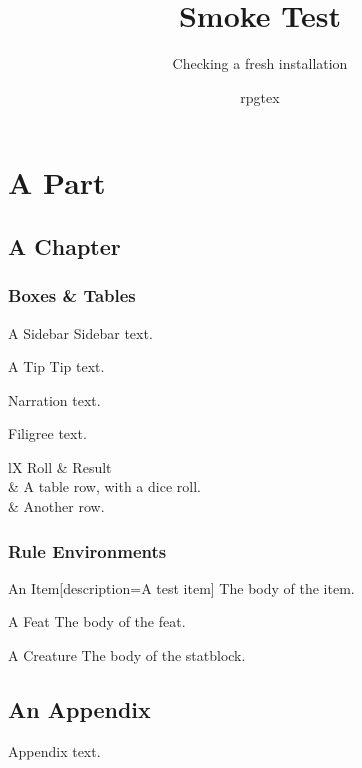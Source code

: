 \documentclass{rpgbook}
\title{Smoke Test}
\subtitle{Checking a fresh installation}
\author{rpgtex}
\begin{document}
\maketitle
\tableofcontents

\part{A Part}
\chapter{A Chapter}

\section{Boxes \& Tables}

\begin{RpgSidebar}{A Sidebar}
	Sidebar text.
\end{RpgSidebar}

\begin{RpgTip}{A Tip}
	Tip text.
\end{RpgTip}

\begin{RpgNarration}
	Narration text.
\end{RpgNarration}

\begin{RpgFiligree}
	Filigree text.
\end{RpgFiligree}

\begin{RpgTable}[title={A Table}]{lX}
	Roll & Result
	\\
	 & A table row, with a dice roll.
	\\
	 & Another row.
\end{RpgTable}

\section{Rule Environments}

\begin{RpgItem}{An Item}[description={A test item}]
	The body of the item.
\end{RpgItem}

\begin{RpgFeat}{A Feat}
	The body of the feat.
\end{RpgFeat}

\begin{RpgStat}{A Creature}
	The body of the statblock.
\end{RpgStat}

\appendix
\chapter{An Appendix}

Appendix text.
\end{document}
